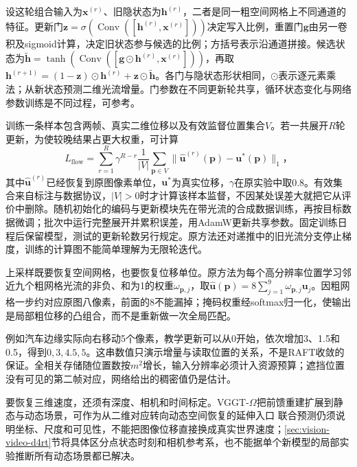 设这轮组合输入为$\bm{x}^{(r)}$、旧隐状态为$\bm{h}^{(r)}$，二者是同一粗空间网格上不同通道的特征。更新门$\bm{z}=\sigma(\operatorname{Conv}([\bm{h}^{(r)},\bm{x}^{(r)}]))$决定写入比例，重置门$\bm{g}$由另一卷积及sigmoid计算，决定旧状态参与候选的比例；方括号表示沿通道拼接。候选状态为$\widetilde{\bm{h}}=\tanh(\operatorname{Conv}([\bm{g}\odot\bm{h}^{(r)},\bm{x}^{(r)}]))$，再取$\bm{h}^{(r+1)}=(1-\bm{z})\odot\bm{h}^{(r)}+\bm{z}\odot\widetilde{\bm{h}}$。各门与隐状态形状相同，$\odot$表示逐元素乘法；从新状态预测二维光流增量。门参数在不同更新轮共享，循环状态变化与网络参数训练是不同过程，可参考。

训练一条样本包含两帧、真实二维位移以及有效监督位置集合$V$。若一共展开$R$轮更新，为使较晚结果占更大权重，可计算
\begin{equation}
  L_{\mathrm{flow}}
  =\sum_{r=1}^{R}\gamma^{R-r}
    \frac{1}{|V|}\sum_{\bm{p}\in V}
    \lVert\widehat{\bm{u}}^{(r)}(\bm{p})-\bm{u}^{*}(\bm{p})\rVert_1\text{，}
  \label{eq:vision-video-raft-loss}
\end{equation}
其中$\widehat{\bm{u}}^{(r)}$已经恢复到原图像素单位，$\bm{u}^{*}$为真实位移，$\gamma$在原实验中取0.8。有效集合来自标注与数据协议，$|V|>0$时才计算该样本监督，不因某处误差大就把它从评价中删除。随机初始化的编码与更新模块先在带光流的合成数据训练，再按目标数据微调；批次中运行完整展开并累积误差，用AdamW更新共享参数。固定训练日程后保留模型，测试的更新轮数另行规定。原方法还对递推中的旧光流分支停止梯度，训练的计算图不能简单理解为无限轮迭代。

上采样既要恢复空间网格，也要恢复位移单位。原方法为每个高分辨率位置学习邻近九个粗网格光流的非负、和为1的权重$\omega_{\bm{p},j}$，取$\widehat{\bm{u}}(\bm{p})=8\sum_{j=1}^{9}\omega_{\bm{p},j}\bm{u}_{j}$。因粗网格一步约对应原图八像素，前面的8不能漏掉；掩码权重经softmax归一化，使输出是局部粗位移的凸组合，而不是重新做一次全局匹配。

例如汽车边缘实际向右移动5个像素，教学更新可以从0开始，依次增加3、1.5和0.5，得到$0,3,4.5,5$。这串数值只演示增量与读取位置的关系，不是RAFT收敛的保证。全相关存储随位置数按$m^2$增长，输入分辨率必须计入资源预算；遮挡位置没有可见的第二帧对应，网络给出的稠密值仍是估计。

要恢复三维速度，还须有深度、相机和时间标定。VGGT-$\Omega$把前馈重建扩展到静态与动态场景，可作为从二维对应转向动态空间恢复的延伸入口 联合预测仍须说明坐标、尺度和可见性，不能把图像位移直接换成真实世界速度；\ref{sec:vision-video-d4rt}节将具体区分点状态时刻和相机参考系，也不能据单个新模型的局部实验推断所有动态场景都已解决。

